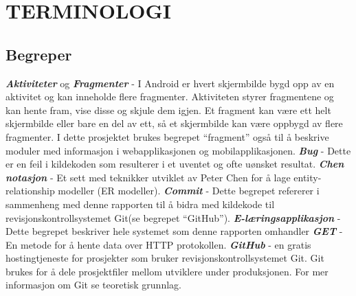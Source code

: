 \documentclass[../main.tex]{subfiles}
\begin{document}
\chapter*{TERMINOLOGI}

\section*{Begreper}

\textbf{\textit{Aktiviteter}} og \textbf{\textit{Fragmenter}} - I Android er hvert skjermbilde bygd opp av en aktivitet og kan inneholde flere fragmenter. Aktiviteten styrer fragmentene og kan hente fram, vise disse og skjule dem igjen. Et fragment kan være ett helt skjermbilde eller bare en del av ett, så et skjermbilde kan være oppbygd av flere fragmenter.  I dette prosjektet brukes begrepet “fragment” også til å beskrive moduler med informasjon i webapplikasjonen og mobilapplikasjonen. \newline
\newline
\textbf{\textit{Bug}} - Dette er en feil i kildekoden som resulterer i et uventet og ofte uønsket resultat.\newline
\newline
\textbf{\textit{Chen notasjon}} - Et sett med teknikker utviklet av Peter Chen for å lage entity-relationship modeller (ER modeller). \newline
\newline
\textbf{\textit{Commit}} - Dette begrepet refererer i sammenheng med denne rapporten til å bidra med kildekode til revisjonskontrollsystemet Git(se begrepet “GitHub”). \newline
\newline
\textbf{\textit{E-læringsapplikasjon}} - Dette begrepet beskriver hele systemet som denne rapporten omhandler\newline
\newline
\textbf{\textit{GET}} - En metode for å hente data over HTTP protokollen.    \newline
\newline
\textbf{\textit{GitHub}} - en gratis hostingtjeneste for prosjekter som bruker revisjonskontrollsystemet Git. Git brukes for å dele prosjektfiler mellom utviklere under produksjonen. For mer informasjon om Git se teoretisk grunnlag.\newline
\end{document}
